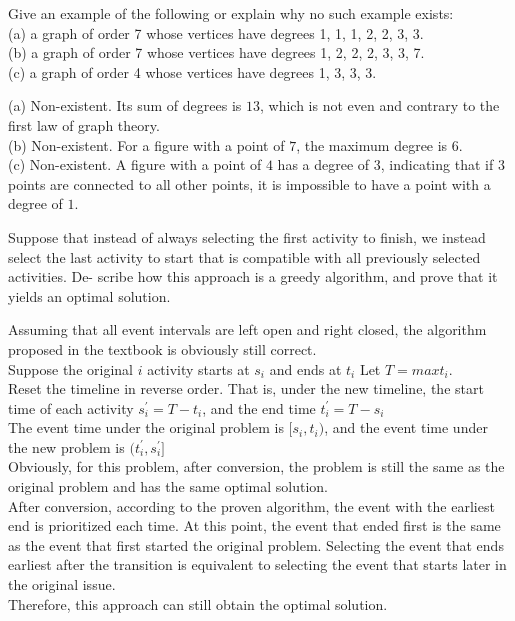\documentclass[a4paper, justified]{tufte-handout}
\begin{document}
\begin{problem}[3-4.6 CZ 2.1]
Give an example of the following or explain why no such example exists:\\
(a) a graph of order 7 whose vertices have degrees 1, 1, 1, 2, 2, 3, 3. \\
(b) a graph of order 7 whose vertices have degrees 1, 2, 2, 2, 3, 3, 7.\\
(c) a graph of order 4 whose vertices have degrees 1, 3, 3, 3.
\end{problem}

\begin{solution}
    (a) Non-existent. Its sum of degrees is $13$, which is not even and contrary to the first law of graph theory.\\
    (b) Non-existent. For a figure with a point of $7$, the maximum degree is $6$.\\
    (c) Non-existent. A figure with a point of $4$ has a degree of $3$, indicating that if $3$ points are connected to all other points, it is impossible to have a point with a degree of $1$.
\end{solution}

\begin{problem}[3-2.1 TC 16.1-2]
Suppose that instead of always selecting the first activity to finish, we instead select the last activity to start that is compatible with all previously selected activities. De- scribe how this approach is a greedy algorithm, and prove that it yields an optimal solution.
\end{problem}

\begin{solution}
    Assuming that all event intervals are left open and right closed, the algorithm proposed in the textbook is obviously still correct. \\
    Suppose the original $i$ activity starts at $s_i$ and ends at $t_i$
    Let $T=max{t_i}$. \\
    Reset the timeline in reverse order. That is, under the new timeline, the start time of each activity $s^{'}_i=T-t_i$, and the end time $t^{'}_i=T-s_i$\\
    The event time under the original problem is $[s_i,t_i)$, and the event time under the new problem is $(t^{'}_i,s^{'}_i]$\\
    Obviously, for this problem, after conversion, the problem is still the same as the original problem and has the same optimal solution. \\
    After conversion, according to the proven algorithm, the event with the earliest end is prioritized each time. At this point, the event that ended first is the same as the event that first started the original problem. Selecting the event that ends earliest after the transition is equivalent to selecting the event that starts later in the original issue. \\
    Therefore, this approach can still obtain the optimal solution.
\end{solution}
\end{document}
